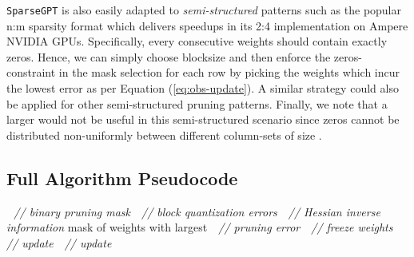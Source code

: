 \documentclass{article}
\theoremstyle{plain}
\theoremstyle{definition}
\theoremstyle{remark}
\newcommand{\sparsegpt}[1]{\texttt{SparseGPT}}
\begin{document}
\sparsegpt{} is also easily adapted to \textit{semi-structured} patterns such as the popular n:m sparsity format \cite{zhou2021learning, hubara2021accelerated} which delivers speedups in its 2:4 implementation on Ampere NVIDIA GPUs. Specifically, every consecutive  weights should contain exactly  zeros. Hence, we can simply choose blocksize  and then enforce the zeros-constraint in the mask selection for each row by picking the  weights which incur the lowest error as per Equation (\ref{eq:obs-update}). A similar strategy could also be applied for other semi-structured pruning patterns. Finally, we note that a larger  would not be useful in this semi-structured scenario since zeros cannot be distributed non-uniformly between different column-sets of size .

\subsection{Full Algorithm Pseudocode}

\begin{algorithm}[h!]
    \centering
    \caption{The \sparsegpt{} algorithm. We prune the layer matrix  to  unstructured sparsity given inverse Hessian , lazy batch-update blocksize  and adaptive mask selection blocksize ; each  consecutive columns will be  sparse.}
    \small
    \label{alg:sparsegpt}
    \begin{algorithmic}
        \STATE  \,\, \textit{// binary pruning mask}
        \STATE  \,\, \textit{// block quantization errors}
        \STATE  \,\, \textit{// Hessian inverse information}
        \FOR {}
            \FOR {}
                {
                \IF {}
                    \STATE  mask of  weights  with largest 
                \ENDIF
                \STATE  \,\, \textit{// pruning error}
                \STATE  \,\, \textit{// freeze weights}
                }
                \STATE  \,\, \textit{// update}
            \ENDFOR
            \STATE  \,\, \textit{// update}
        \ENDFOR
    \end{algorithmic}
\end{algorithm}
\end{document}
